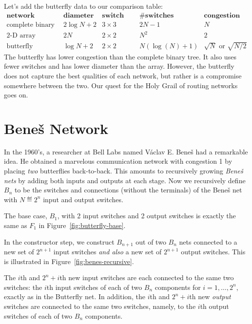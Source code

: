 Let's add the butterfly data to our comparison table:
%
\[
\begin{array}{r|c|c|c|c}
\textbf{network} &
\textbf{diameter} &
\textbf{switch size} &
\textbf{\# switches} &
\textbf{congestion} \\ \hline
\text{complete binary tree} & 2 \log N + 2 & 3 \times 3 & 2N - 1 & N \\
\text{2-D array} & 2 N & 2 \times 2 & N^2 & 2 \\
\text{butterfly} & \log N + 2 & 2 \times 2 & N (\log(N) + 1) & \sqrt{N} \text{ or } \sqrt{N/2}
\end{array}
\]
% 
The butterfly has lower congestion than the complete binary tree.
It also uses fewer switches and has lower diameter than the array.
However, the butterfly does not capture the best qualities of each
network, but rather is a compromise somewhere between the two.  Our
quest for the Holy Grail of routing networks goes on.

\section{Bene\v{s} Network}

In the 1960's, a researcher at Bell Labs named V\'{a}clav E. Bene\v{s}%
 had a
remarkable idea.  He obtained a marvelous communication network with
congestion 1 by placing \textit{two} butterflies back-to-back.  This
amounts to recursively growing \emph{Bene\v{s} nets}%
by adding both inputs and outputs at each stage.  Now we 
recursively define $B_n$ to be the
switches and connections (without the terminals) of the Bene\v{s} net
with $N \eqdef 2^n$ input and output switches.

The base case, $B_1$, with 2 input switches and 2 output switches is
exactly the same as $F_1$ in Figure~\ref{fig:butterfly-base}.

In the constructor step, we construct $B_{n+1}$ out of two $B_n$ nets
connected to a new set of $2^{n+1}$ input switches \emph{and also} a
new set of $2^{n+1}$ output switches.  This is illustrated in
Figure~\ref{fig:benes-recursive}.

The $i$th and $2^n+i$th new input switches are each connected to
the same two switches: the $i$th input switches of each of two
$B_n$ components for $i=1,\dots,2^n$, exactly as in the Butterfly net.  In
addition, the $i$th and $2^n+i$th new \emph{output} switches are connected
to the same two switches, namely, to the $i$th output switches of each of
two $B_n$ components.


